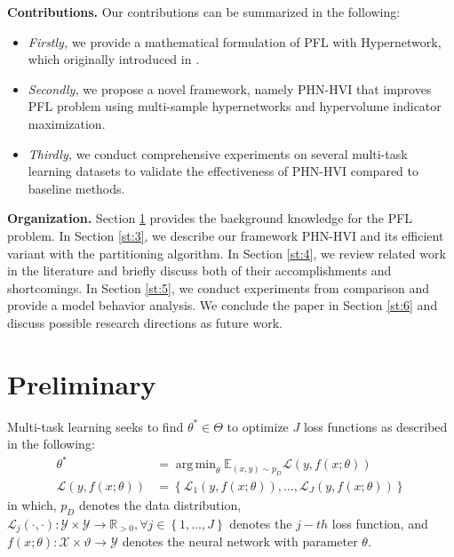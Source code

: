 \documentclass[letterpaper]{article} %
\DeclareMathOperator*{\argmin}{arg\,min}
\newcommand{\ourmodel}{PHN-HVI }
\begin{document}
{\bf Contributions.} Our contributions can be summarized in the following:
\begin{itemize}
    \item \emph{Firstly,} we provide a mathematical formulation of PFL with Hypernetwork, which originally introduced in \cite{navon2021learning}.
    \item \emph{Secondly,} we propose a novel framework, namely \ourmodel that improves PFL problem using multi-sample hypernetworks and hypervolume indicator maximization.
    \item \emph{Thirdly,} we conduct comprehensive experiments on several multi-task learning datasets to validate the effectiveness of \ourmodel compared to baseline methods.
\end{itemize}

{\bf Organization.} Section \ref{st:2} provides the background knowledge for the PFL problem. In Section \ref{st:3}, we describe our framework \ourmodel and its efficient variant with the partitioning algorithm. In Section \ref{st:4}, we review related work in the literature and briefly discuss both of their accomplishments and shortcomings. In Section \ref{st:5}, we conduct experiments from comparison and provide a model behavior analysis. We conclude the paper in Section \ref{st:6} and discuss possible research directions as future work.

\section{Preliminary}
\label{st:2}
Multi-task learning seeks to find $\theta^* \in \Theta$ to optimize $J$ loss functions as described in the following:
\begin{align}
    \theta^* &= \argmin_{\theta} \mathbb{E}_{(x, y) \sim p_D} \mathcal{L}\left(y, f\left(x; \theta \right)\right)\\
    \mathcal{L}\left(y, f\left(x; \theta \right)\right) &=\left\{ \mathcal{L}_1\left(y, f\left(x; \theta \right)\right),
    \nonumber
    \dots,
     \mathcal{L}_J\left(y, f\left(x; \theta \right)\right) \right\}
\end{align}
in which, $p_D$ denotes the data distribution,  $\mathcal{L}_j\left(\cdot, \cdot \right):
\mathcal{Y} \times \mathcal{Y} \rightarrow \mathbb{R}_{>0}, \forall j \in
\left\{1, \dots, J\right\}$ denotes the $j-th$ loss function, and $f\left(x; \theta \right): \mathcal{X} \times \vartheta \rightarrow \mathcal{Y}$ denotes the neural network with parameter $\theta$.
\end{document}
